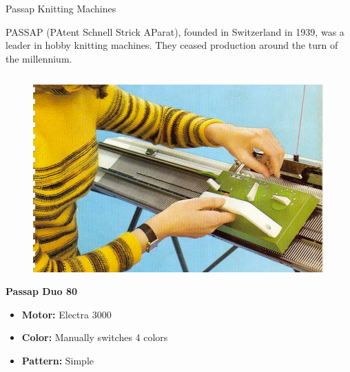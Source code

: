 \documentclass[
    NAME={Dr. Helga Ingimundardóttir},
    EMAIL={helgaingim@hi.is},
    FACULTY={Industrial Engineering},
    TITLE={HiDef Textiles: Reviving Tradition with Innovation},
    SUBTITLE={Empowering Creativity and Sustainability in Textile Production through Digital Transformation},
    SEMINAR={Reykjavík DataBeers},
    DATE={January 25, 2025},
    WIDE={true}
]{HI-LaTeX/hi-beamer}
\begin{document}
    \begin{frame}{Passap Knitting Machines}

        PASSAP (PAtent Schnell Strick AParat), founded in Switzerland in 1939, was a leader in hobby knitting machines. They ceased production around the turn of the millennium.

        \begin{columns}

            \begin{column}{0.45\textwidth}
                \begin{figure}
                    \includegraphics[height=0.3\textheight]{include/duo80.png}
                \end{figure}
                \textbf{Passap Duo 80}
                \begin{itemize}
                    \item \textbf{Motor:} Electra 3000
                    \item \textbf{Color:} Manually switches 4 colors
                    \item \textbf{Pattern:} Simple
                \end{itemize}
            \end{column}


\end{columns}
\end{frame}
\end{document}
